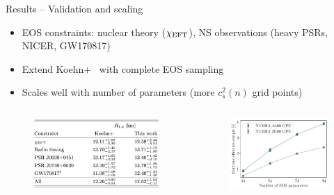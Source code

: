 \documentclass[usenames,dvipsnames,t]{beamer}
\begin{document}
\begin{frame}{Results -- Validation and scaling}

  \def\x{2mm}
  \def\y{2mm}

  \begin{itemize}
    \vspace{\y}
    \item EOS constraints: nuclear theory ($\chi_{\rm{EFT}}$), NS observations (heavy PSRs, NICER, GW170817)

    \vspace{\y}
    \item Extend Koehn+~\cite{Koehn:2024set} with complete EOS sampling

    \vspace{\y}
    \item Scales well with number of parameters (more $c_s^2(n)$ grid points)
  \end{itemize}

  \vspace{\x}

  \begin{columns}


    \begin{figure}[htpb]
      \centering
      \includegraphics[width=0.975\linewidth]{Figures/R14_table.jpg}
    \end{figure}

    \begin{figure}[htpb]
      \centering
      \includegraphics[width=0.975\linewidth]{Figures/scaling_plot.pdf}
    \end{figure}


\end{columns}
\end{frame}
\end{document}
